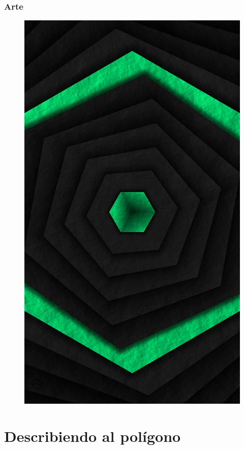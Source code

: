 \documentclass[14pt]{beamer}
\begin{document}
\begin{frame}
\frametitle{Arte}
\begin{figure}
    \centering
    \includegraphics[scale=0.12]{Imagenes/Abstracto_Hexagonal.jpg}
\end{figure}
\end{frame}

\section{Describiendo al polígono}
\end{document}
